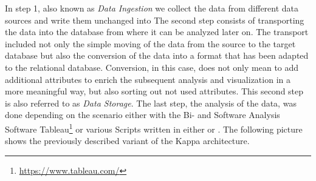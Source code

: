 In step 1, also known as \textit{Data Ingestion} we collect the data from different data sources and write them unchanged into \gds{}
The second step consists of transporting the data into the \pg{} database from where it can be analyzed later on.
The transport included not only the simple moving of the data from the source to the target database but also the conversion of the data
into a format that has been adapted to the relational database.
Conversion, in this case, does not only mean to add additional attributes to enrich the subsequent analysis and visualization in a more meaningful way,
but also sorting out not used attributes. This second step is also referred to as \textit{Data Storage}.
The last step, the analysis of the data, was done depending on the scenario either with the Bi- and Software Analysis Software Tableau\footnote{\url{https://www.tableau.com/}} or various Scripts written in either  or .
\newline
The following picture shows the previously described variant of the Kappa architecture.

